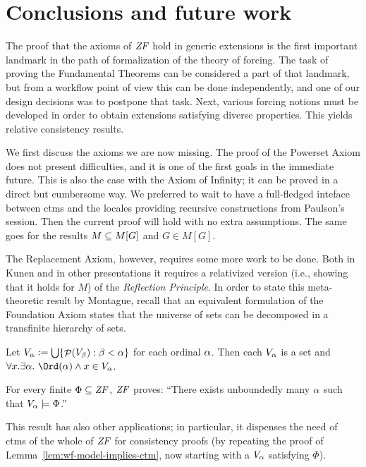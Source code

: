 \section{Conclusions and future work}
\label{sec:conclusions-future-work}

The proof that the axioms of $\mathit{ZF}$ hold in generic extensions is 
the first important landmark in the path of formalization of the
theory of forcing. The task of proving the Fundamental Theorems can be
considered a part of that landmark, but from a workflow point of view
this can be done independently, and one of our design decisions was to
postpone that task.  Next, various forcing notions must be developed
in order to obtain extensions satisfying diverse properties. This
yields relative consistency results.

We first discuss the axioms we are now missing. The proof of the
Powerset Axiom does not present difficulties, and it is one of the
first goals in the immediate future. This is also the case with the
Axiom of Infinity; it can be proved in a direct but cumbersome way. We
preferred to wait to have a full-fledged inteface between ctms and the
locales providing recursive constructions from Paulson's
 session. Then the current proof will hold
with no extra assumptions. The same goes for the results $M\subseteq M[G]$
and $G\in M[G]$.

The Replacement Axiom, however, requires some more work to be
done. Both in Kunen and in other presentations \cite{neeman-course}
it requires a relativized version (i.e., showing that it holds for $M$) of
the \emph{Reflection Principle}. In order to state this meta-theoretic
result by Montague, recall that
an equivalent formulation of the Foundation Axiom states that the 
universe of sets can be decomposed in a transfinite hierarchy of
sets. 
\begin{theorem}
  Let $V_{\alpha}\mathrel{\mathop:}=\mathop{\textstyle\bigcup}\{\mathop{\mathcal{P}}(V_\beta) : \beta<\alpha\}$ for each ordinal
  $\alpha$. Then each $V_\alpha$ is a set and 
  $\forall x. \exists\al .\ \Ord(\al) \y x\in V_\al$.  
\end{theorem}
\begin{theorem}\label{th:reflection-principle}
  For every finite $\Phi\subseteq\mathit{ZF}$, $\mathit{ZF}$ proves: ``There exists
  unboundedly many $\alpha$ such that $V_\alpha\models \Phi$.''
\end{theorem}

This result has also other applications; in particular, it dispenses
the need of ctms of the whole of $\mathit{ZF}$ for consistency proofs (by
repeating  the proof of Lemma~\ref{lem:wf-model-implies-ctm}, now
starting with a  $V_\alpha$ satisfying $\Phi$). 


